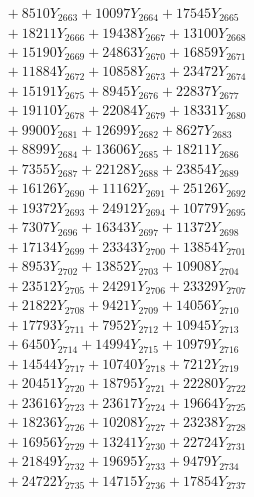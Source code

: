 \documentclass[a4paper,10pt]{article}
\begin{document}
{\begin{align}
&\;  + 8510 Y_{2663} + 10097 Y_{2664} + 17545 Y_{2665} \\[0.3ex]
&\;  + 18211 Y_{2666} + 19438 Y_{2667} + 13100 Y_{2668} \\[0.5ex]\allowbreak
&\;  + 15190 Y_{2669} + 24863 Y_{2670} + 16859 Y_{2671} \\[0.3ex]
&\;  + 11884 Y_{2672} + 10858 Y_{2673} + 23472 Y_{2674} \\[0.3ex]
&\;  + 15191 Y_{2675} + 8945 Y_{2676} + 22837 Y_{2677} \\[0.3ex]
&\;  + 19110 Y_{2678} + 22084 Y_{2679} + 18331 Y_{2680} \\[0.3ex]
&\;  + 9900 Y_{2681} + 12699 Y_{2682} + 8627 Y_{2683} \\[0.3ex]
&\;  + 8899 Y_{2684} + 13606 Y_{2685} + 18211 Y_{2686} \\[0.3ex]
&\;  + 7355 Y_{2687} + 22128 Y_{2688} + 23854 Y_{2689} \\[0.3ex]
&\;  + 16126 Y_{2690} + 11162 Y_{2691} + 25126 Y_{2692} \\[0.3ex]
&\;  + 19372 Y_{2693} + 24912 Y_{2694} + 10779 Y_{2695} \\[0.3ex]
&\;  + 7307 Y_{2696} + 16343 Y_{2697} + 11372 Y_{2698} \\[0.5ex]\allowbreak
&\;  + 17134 Y_{2699} + 23343 Y_{2700} + 13854 Y_{2701} \\[0.3ex]
&\;  + 8953 Y_{2702} + 13852 Y_{2703} + 10908 Y_{2704} \\[0.3ex]
&\;  + 23512 Y_{2705} + 24291 Y_{2706} + 23329 Y_{2707} \\[0.3ex]
&\;  + 21822 Y_{2708} + 9421 Y_{2709} + 14056 Y_{2710} \\[0.3ex]
&\;  + 17793 Y_{2711} + 7952 Y_{2712} + 10945 Y_{2713} \\[0.3ex]
&\;  + 6450 Y_{2714} + 14994 Y_{2715} + 10979 Y_{2716} \\[0.3ex]
&\;  + 14544 Y_{2717} + 10740 Y_{2718} + 7212 Y_{2719} \\[0.3ex]
&\;  + 20451 Y_{2720} + 18795 Y_{2721} + 22280 Y_{2722} \\[0.3ex]
&\;  + 23616 Y_{2723} + 23617 Y_{2724} + 19664 Y_{2725} \\[0.3ex]
&\;  + 18236 Y_{2726} + 10208 Y_{2727} + 23238 Y_{2728} \\[0.5ex]\allowbreak
&\;  + 16956 Y_{2729} + 13241 Y_{2730} + 22724 Y_{2731} \\[0.3ex]
&\;  + 21849 Y_{2732} + 19695 Y_{2733} + 9479 Y_{2734} \\[0.3ex]
&\;  + 24722 Y_{2735} + 14715 Y_{2736} + 17854 Y_{2737} \\[0.3ex]

\end{align}}
\end{document}
